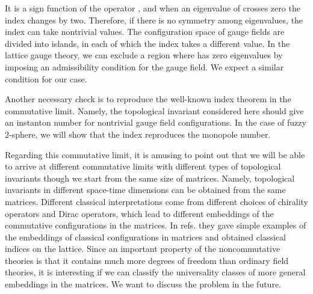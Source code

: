 \documentclass[a4paper,prl,showpacs,twocolumn]{revtex4}
\begin{document}
It is a sign function of the operator \coordHE{},
and when an eigenvalue of \coordHE{} crosses zero the index changes
by two. Therefore, if there is no symmetry among eigenvalues, 
the index can take nontrivial values.
The configuration space of gauge fields are divided into
islands, in each of which the index takes a  different value.
In the lattice gauge theory, we can exclude a region where
\coordHE{} has zero eigenvalues by imposing an admissibility condition
for the gauge field. 
We expect a similar condition for our case.
\par
Another necessary check is to reproduce the well-known index 
theorem in the commutative limit. Namely, the topological 
invariant considered here should give an instanton number 
for nontrivial gauge field configurations.
In the case of fuzzy 2-sphere, we will show that the index 
reproduces the monopole number.
\par
Regarding this commutative limit, it is amusing to point out 
that we will be able to arrive at different commutative limits 
with different types of topological invariants
though we start from the same size of matrices.
Namely, topological invariants in different space-time dimensions 
can be obtained from the same matrices.
Different classical interpretations come from different choices 
of chirality
operators and  Dirac operators, which 
 lead to different embeddings of 
the commutative configurations in the matrices.
In refs.\cite{Kiskis,KikukawaSuzuki} they
gave simple examples of the embeddings of classical configurations
in matrices and obtained classical indices on the lattice.
Since an important property of the noncommutative theories
is that it contains much more degrees of freedom than ordinary
field theories, 
it is interesting if we can classify the universality classes
of more general embeddings in the matrices.
We want to discuss the problem in the future\cite{AINfuture}. 
\end{document}
